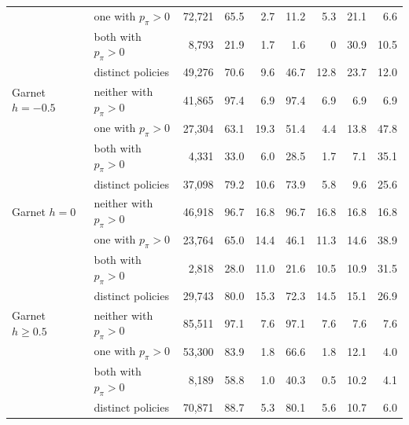 \begin{tabular}{llrrrrrrr}
 & one with $p_\pi{>}0$ & 72{,}721 & 65.5 & 2.7 & 11.2 & 5.3 & 21.1 & 6.6 \\
 & both with $p_\pi{>}0$ & 8{,}793 & 21.9 & 1.7 & 1.6 & 0 & 30.9 & 10.5 \\
 & distinct policies & 49{,}276 & 70.6 & 9.6 & 46.7 & 12.8 & 23.7 & 12.0 \\
\addlinespace[2pt]
Garnet $h{=}{-}0.5$ & neither with $p_\pi{>}0$ & 41{,}865 & 97.4 & 6.9 & 97.4 & 6.9 & 6.9 & 6.9 \\
 & one with $p_\pi{>}0$ & 27{,}304 & 63.1 & 19.3 & 51.4 & 4.4 & 13.8 & 47.8 \\
 & both with $p_\pi{>}0$ & 4{,}331 & 33.0 & 6.0 & 28.5 & 1.7 & 7.1 & 35.1 \\
 & distinct policies & 37{,}098 & 79.2 & 10.6 & 73.9 & 5.8 & 9.6 & 25.6 \\
\addlinespace[2pt]
Garnet $h{=}0$ & neither with $p_\pi{>}0$ & 46{,}918 & 96.7 & 16.8 & 96.7 & 16.8 & 16.8 & 16.8 \\
 & one with $p_\pi{>}0$ & 23{,}764 & 65.0 & 14.4 & 46.1 & 11.3 & 14.6 & 38.9 \\
 & both with $p_\pi{>}0$ & 2{,}818 & 28.0 & 11.0 & 21.6 & 10.5 & 10.9 & 31.5 \\
 & distinct policies & 29{,}743 & 80.0 & 15.3 & 72.3 & 14.5 & 15.1 & 26.9 \\
\addlinespace[2pt]
Garnet $h{\ge}0.5$ & neither with $p_\pi{>}0$ & 85{,}511 & 97.1 & 7.6 & 97.1 & 7.6 & 7.6 & 7.6 \\
 & one with $p_\pi{>}0$ & 53{,}300 & 83.9 & 1.8 & 66.6 & 1.8 & 12.1 & 4.0 \\
 & both with $p_\pi{>}0$ & 8{,}189 & 58.8 & 1.0 & 40.3 & 0.5 & 10.2 & 4.1 \\
 & distinct policies & 70{,}871 & 88.7 & 5.3 & 80.1 & 5.6 & 10.7 & 6.0 \\
\bottomrule
\end{tabular}
